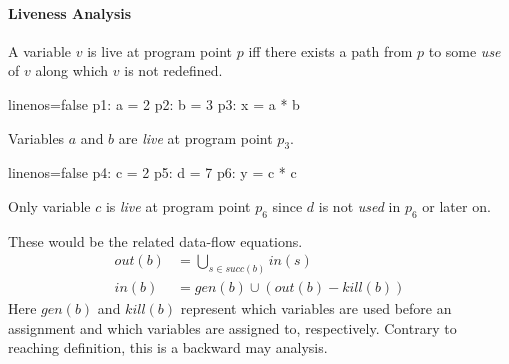 \documentclass[article]{uibk}
\begin{document}
\paragraph{Liveness Analysis}

A variable $v$ is live at program point $p$ iff there exists a path from $p$ to
some \emph{use} of $v$ along which $v$ is not redefined.~\cite{wiki:liveness}

\begin{minipage}[t]{0.45\textwidth}
    \begin{code*}{linenos=false}
        p1: a = 2
        p2: b = 3
        p3: x = a * b
    \end{code*}

    Variables $a$ and $b$ are \textit{live} at program point $p_3$.
\end{minipage}\hfill
\begin{minipage}[t]{0.45\textwidth}
    \begin{code*}{linenos=false}
        p4: c = 2
        p5: d = 7
        p6: y = c * c
    \end{code*}

    Only variable $c$ is \textit{live} at program point $p_6$ since $d$ is not
    \textit{used} in $p_6$ or later on.
\end{minipage}
\vspace{2em}

These would be the related data-flow equations.
%
\begin{align*}
    out(b) &= \bigcup_{s \in succ(b)} in(s) \\
    in(b)  &= gen(b) \cup (out(b) - kill(b))
\end{align*}
%
Here $gen(b)$ and $kill(b)$ represent which variables are used before an
assignment and which variables are assigned to, respectively. Contrary to
reaching definition, this is a backward may analysis.

%
%
%
\end{document}
